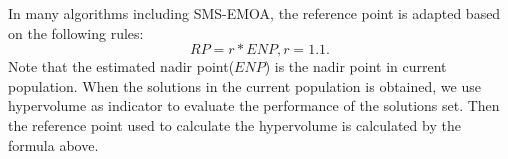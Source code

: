 \documentclass[conference]{IEEEtran}
\begin{document}
In many algorithms including SMS-EMOA\cite{smsemoa}, 
the reference point is adapted based on the following rules:
\begin{equation}\label{frpa1}
  RP = r * ENP, r = 1.1.
\end{equation}
Note that the estimated nadir point($ENP$) is the nadir point in current population.
When the solutions in the current population is obtained, 
we use hypervolume as indicator to evaluate the performance of the solutions set. 
Then the reference point used to calculate the hypervolume is calculated by the formula above.

\begin{figure}[!t]
  \centering
  \quad
  \\
  \quad
  \\

\end{figure}
\end{document}
